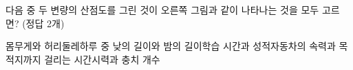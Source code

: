 \noindent\begin{minipage}[t]{0.58\linewidth}\vspace{0pt}\raggedright 다음 중 두 변량의 산점도를 그린 것이 오른쪽 그림과 같이 나타나는 것을 모두 고르면? (정답 2개)\end{minipage}\hfill\begin{minipage}[t]{0.4\linewidth}\vspace{0pt}\centering \resizebox{\ifdim\width>\linewidth\linewidth\else\width\fi}{!}{}\end{minipage}\par
\begin{choicesv}{몸무게와 허리둘레}{하루 중 낮의 길이와 밤의 길이}{학습 시간과 성적}{자동차의 속력과 목적지까지 걸리는 시간}{시력과 충치 개수}\end{choicesv}
